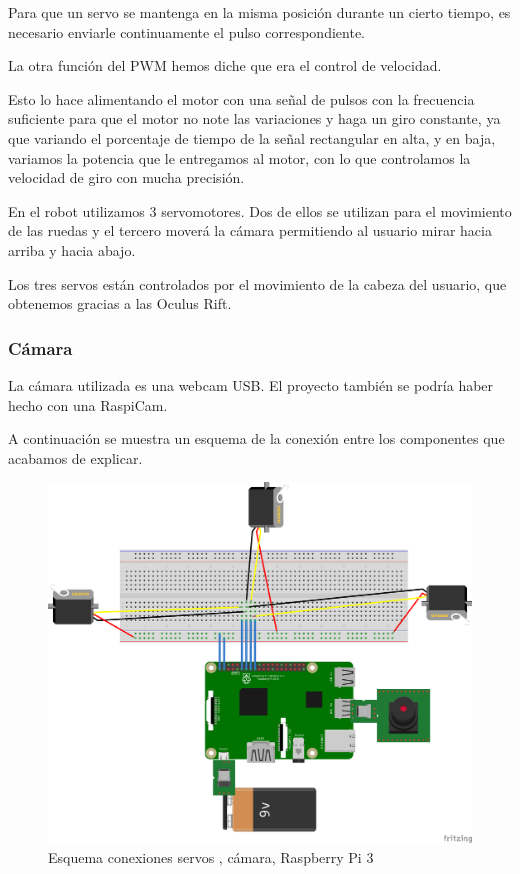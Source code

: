 \documentclass[twoside, 12pt]{epstfg}
\begin{document}
Para que un servo se mantenga en la misma posición durante un cierto tiempo, es necesario enviarle continuamente el pulso correspondiente.


La otra función del PWM hemos diche que era el control de velocidad.

Esto lo hace alimentando el motor con una señal de pulsos con la frecuencia suficiente para que el motor no note las variaciones y haga un giro constante, ya que variando el porcentaje de tiempo de la señal rectangular en alta, y en baja, variamos la potencia que le entregamos al motor, con lo que controlamos la velocidad de giro con mucha precisión.

En el robot utilizamos 3 servomotores.
Dos de ellos se utilizan para el movimiento de las ruedas y el tercero moverá la cámara permitiendo al usuario mirar hacia arriba y hacia abajo.

Los tres servos están controlados por el movimiento de la cabeza del usuario, que obtenemos gracias a las Oculus Rift.

\subsubsection{Cámara}

La cámara utilizada es una webcam USB. El proyecto también se podría haber hecho con una RaspiCam.

A continuación se muestra un esquema de la conexión entre los componentes que acabamos de explicar.


\begin{figure}[h]
	\centerline{
		\mbox{\includegraphics[width=.95\textwidth]{images/EsquemaServos.png}}
	}
	\caption{Esquema conexiones servos , cámara, Raspberry Pi 3}
\end{figure}
\end{document}
